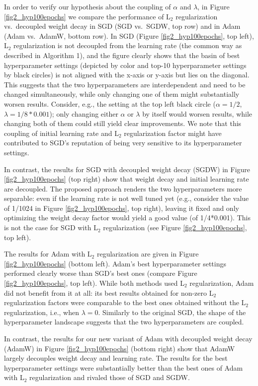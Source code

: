 \documentclass[usenames,dvipsnames]{article}
\begin{document}
In order to verify our hypothesis about the coupling of $\alpha$ and  $\lambda$, in Figure \ref{fig2_hyp100epochs} we compare the performance of L$_2$ regularization vs.\ decoupled weight decay in SGD (SGD vs.\ SGDW, top row) and in Adam (Adam vs.\ AdamW, bottom row). In SGD (Figure \ref{fig2_hyp100epochs}, top left), L$_2$ regularization is not decoupled from the learning rate (the common way as described in Algorithm 1), and the figure clearly shows that the basin of best hyperparameter settings (depicted by color and top-10 hyperparameter settings by black circles) is not aligned with the x-axis or y-axis but lies on the diagonal. This suggests that the two hyperparameters are interdependent and need to be changed simultaneously, while only changing one of them might substantially worsen results. Consider, e.g., the setting at the top left black circle ($\alpha=1/2$, $\lambda=1/8*0.001$); only changing either $\alpha$ or $\lambda$ by itself would worsen results, while changing both of them could still yield clear improvements. We note that this coupling of initial learning rate and L$_2$ regularization factor might have contributed to SGD's reputation of being very sensitive to its hyperparameter settings. 

In contrast, the results for SGD with decoupled weight decay (SGDW) in Figure \ref{fig2_hyp100epochs} (top right) show that weight decay and initial learning rate are decoupled. The proposed approach renders the two hyperparameters more separable: even if the learning rate is not well tuned yet (e.g., consider the value of 1/1024 in Figure \ref{fig2_hyp100epochs}, top right), leaving it fixed and only optimizing the weight decay factor would yield a good value (of 1/4*0.001). This is not the case for SGD with L$_2$ regularization (see Figure \ref{fig2_hyp100epochs}, top left). 

The results for Adam with L$_2$ regularization are given in Figure \ref{fig2_hyp100epochs} (bottom left). Adam's best hyperparameter settings performed clearly worse than SGD's best ones (compare Figure \ref{fig2_hyp100epochs}, top left). While both methods used L$_2$ regularization,  Adam did not benefit from it at all: its best results obtained for non-zero L$_2$ regularization factors were comparable to the best ones obtained without the L$_2$ regularization, i.e., when $\lambda=0$.   
Similarly to the original SGD, the shape of the hyperparameter landscape suggests that the two hyperparameters are coupled. 

In contrast, the results for our new variant of Adam with decoupled weight decay (AdamW) in Figure \ref{fig2_hyp100epochs} (bottom right) show that AdamW largely decouples weight decay and learning rate. The results for the best hyperparameter settings were substantially better than the best ones of Adam with L$_2$ regularization and rivaled those of SGD and SGDW. 
\end{document}
